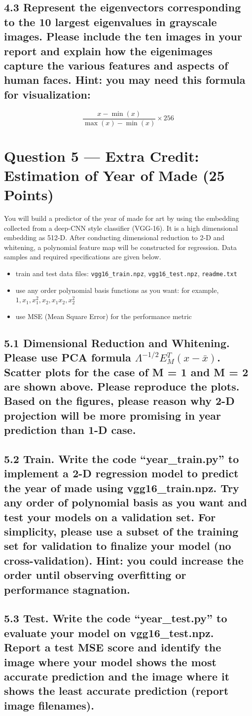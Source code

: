 \documentclass[12pt]{article}
\begin{document}
\subsection*{4.3
Represent the eigenvectors corresponding to the 10 largest eigenvalues in grayscale images. Please include the ten images in your report and explain how the eigenimages capture the various features and aspects of human faces. Hint: you may need this formula for visualization:}
\[
\frac{x - \min(x)}{\max(x) - \min(x)} \times 256
\]

\newpage
\section*{Question 5 — Extra Credit: Estimation of Year of Made (25 Points)}

You will build a predictor of the year of made for art by using the embedding collected from a deep-CNN style classifier (VGG-16). It is a high dimensional embedding as 512-D. After conducting dimensional reduction to 2-D and whitening, a polynomial feature map will be constructed for regression. Data samples and required specifications are given below.

\begin{itemize}
  \item train and test data files: \texttt{vgg16\_train.npz}, \texttt{vgg16\_test.npz}, \texttt{readme.txt}
  \item use any order polynomial basis functions as you want: for example, $1, x_1, x_1^2, x_2, x_1x_2, x_2^2$
  \item use MSE (Mean Square Error) for the performance metric
\end{itemize}

\subsection*{5.1
Dimensional Reduction and Whitening. Please use PCA formula $\Lambda^{-1/2}E_M^T(x-\bar{x})$. Scatter plots for the case of M = 1 and M = 2 are shown above. Please reproduce the plots. Based on the figures, please reason why 2-D projection will be more promising in year prediction than 1-D case.}

\subsection*{5.2
Train. Write the code “year\_train.py” to implement a 2-D regression model to predict the year of made using vgg16\_train.npz. Try any order of polynomial basis as you want and test your models on a validation set. For simplicity, please use a subset of the training set for validation to finalize your model (no cross-validation). Hint: you could increase the order until observing overfitting or performance stagnation.}

\subsection*{5.3
Test. Write the code “year\_test.py” to evaluate your model on vgg16\_test.npz. Report a test MSE score and identify the image where your model shows the most accurate prediction and the image where it shows the least accurate prediction (report image filenames).}
\end{document}
